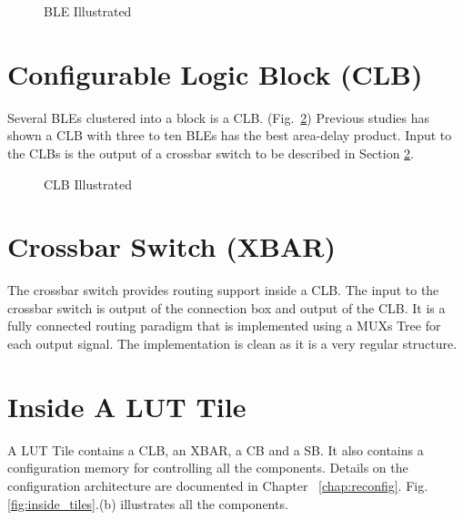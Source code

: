 \begin{figure}[htp]
	\begin{center}
		\renewcommand{\captionfont}{\small}
		\caption{BLE Illustrated}
		\label{fig:ble_illu}
	\end{center}
\end{figure}

\section{Configurable Logic Block (CLB)}
\label{sec:clb}

Several BLEs clustered into a block is a CLB. (Fig.~\ref{fig:clb}) Previous studies has shown
a CLB with three to ten BLEs has the best area-delay product. \cite{1281800} Input to the CLBs
is the output of a crossbar switch to be described in Section \ref{sec:xbar}. \par

\begin{figure}[tbp]
	\begin{center}
		\textwidth
		    \renewcommand{\captionfont}{\small}
				\caption{CLB Illustrated
				\label{fig:clb}}
	\end{center}
\end{figure}

\section{Crossbar Switch (XBAR)}
\label{sec:xbar}
The crossbar switch provides routing support inside a CLB. The input to the crossbar switch is output of the connection box
and output of the CLB. It is a fully connected routing paradigm that is implemented using a MUXs Tree for each output signal. The implementation
is clean as it is a very regular structure. \par

\section{Inside A LUT Tile}
\label{sec:pit-lut-tile}
A LUT Tile contains a CLB, an XBAR, a CB and a SB. It also contains a configuration memory for controlling all the components. Details
on the configuration architecture are documented in Chapter ~\ref{chap:reconfig}. Fig.\ref{fig:inside_tiles}.(b) illustrates all the components. \par

